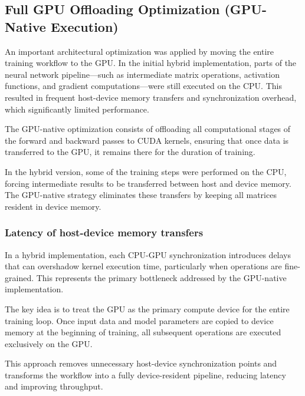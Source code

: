 \documentclass[conference, 12pt]{IEEEtran}
\begin{document}
\subsection{Full GPU Offloading Optimization (GPU-Native Execution)}
An important architectural optimization was applied by moving the entire training workflow to the GPU. In the initial hybrid implementation, parts of the neural network pipeline—such as intermediate matrix operations, activation functions, and gradient computations—were still executed on the CPU. This resulted in frequent host-device memory transfers and synchronization overhead, which significantly limited performance.

The GPU-native optimization consists of offloading all computational stages of the forward and backward passes to CUDA kernels, ensuring that once data is transferred to the GPU, it remains there for the duration of training.

In the hybrid version, some of the training steps were performed on the CPU, forcing intermediate results to be transferred between host and device memory. The GPU-native strategy eliminates these transfers by keeping all matrices resident in device memory.

\subsubsection{Latency of host-device memory transfers}
 In a hybrid implementation, each CPU-GPU synchronization introduces delays that can overshadow kernel execution time, particularly when operations are fine-grained. This represents the primary bottleneck addressed by the GPU-native implementation.

The key idea is to treat the GPU as the primary compute device for the entire training loop. Once input data and model parameters are copied to device memory at the beginning of training, all subsequent operations are executed exclusively on the GPU.

This approach removes unnecessary host-device synchronization points and transforms the workflow into a fully device-resident pipeline, reducing latency and improving throughput.
\end{document}
